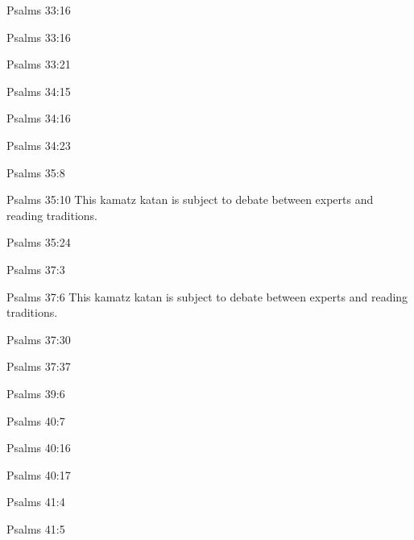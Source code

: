 \documentclass[14pt]{article}
\begin{document}
\begin{itemize}
{{{{\item Psalms 33:16

\item Psalms 33:16

\item Psalms 33:21

\item Psalms 34:15

\item Psalms 34:16

\item Psalms 34:23

\item Psalms 35:8

\item Psalms 35:10 This kamatz katan is subject to debate between experts and reading traditions.

\item Psalms 35:24

\item Psalms 37:3

\item Psalms 37:6 This kamatz katan is subject to debate between experts and reading traditions.

\item Psalms 37:30

\item Psalms 37:37

\item Psalms 39:6

\item Psalms 40:7

\item Psalms 40:16

\item Psalms 40:17

\item Psalms 41:4

\item Psalms 41:5

}}}}
\end{itemize}
\end{document}

